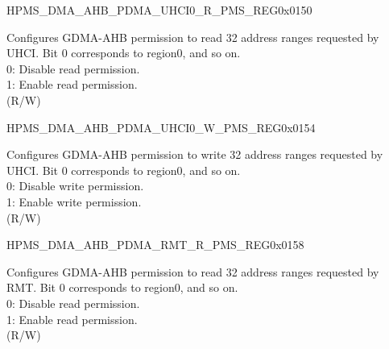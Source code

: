 \begin{register}{H}{PMS\_DMA\_AHB\_PDMA\_UHCI0\_R\_PMS\_REG}{0x0150}\label{regdesc:PMSDMAAHBPDMAUHCI0RPMSREG}
%
\regnewline%
\begin{regdesc}\begin{reglist}
\label{fielddesc:PMSDMAAHBPDMAUHCI0RPMS}\item [PMS\_DMA\_AHB\_PDMA\_UHCI0\_R\_PMS] Configures GDMA-AHB permission to read 32 address ranges requested by UHCI. Bit 0 corresponds to region0, and so on.\\
0: Disable read permission.\\
1: Enable read permission.\\ (R/W)
\end{reglist}\end{regdesc}
\end{register}


\begin{register}{H}{PMS\_DMA\_AHB\_PDMA\_UHCI0\_W\_PMS\_REG}{0x0154}\label{regdesc:PMSDMAAHBPDMAUHCI0WPMSREG}
%
\regnewline%
\begin{regdesc}\begin{reglist}
\label{fielddesc:PMSDMAAHBPDMAUHCI0WPMS}\item [PMS\_DMA\_AHB\_PDMA\_UHCI0\_W\_PMS] Configures GDMA-AHB permission to write 32 address ranges requested by UHCI. Bit 0 corresponds to region0, and so on.\\
0: Disable write permission.\\
1: Enable write permission.\\ (R/W)
\end{reglist}\end{regdesc}
\end{register}


\begin{register}{H}{PMS\_DMA\_AHB\_PDMA\_RMT\_R\_PMS\_REG}{0x0158}\label{regdesc:PMSDMAAHBPDMARMTRPMSREG}
%
\regnewline%
\begin{regdesc}\begin{reglist}
\label{fielddesc:PMSDMAAHBPDMARMTRPMS}\item [PMS\_DMA\_AHB\_PDMA\_RMT\_R\_PMS] Configures GDMA-AHB permission to read 32 address ranges requested by RMT. Bit 0 corresponds to region0, and so on.\\
0: Disable read permission.\\
1: Enable read permission.\\ (R/W)
\end{reglist}\end{regdesc}
\end{register}


